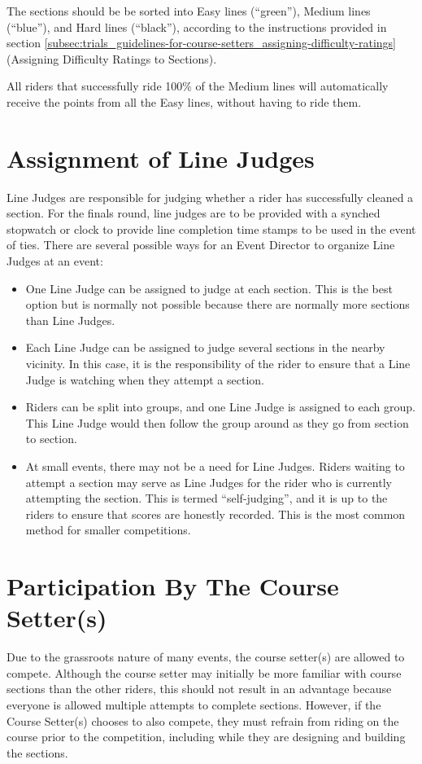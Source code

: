 The sections should be be sorted into Easy lines (``green''), Medium lines (``blue''), and Hard lines (``black''), according to the instructions provided in section \ref{subsec:trials_guidelines-for-course-setters_assigning-difficulty-ratings} (Assigning Difficulty Ratings to Sections).

All riders that successfully ride 100\% of the Medium lines will automatically receive the points from all the Easy lines, without having to ride them.

\section{Assignment of Line Judges}
Line Judges are responsible for judging whether a rider has successfully cleaned a section.
For the finals round, line judges are to be provided with a synched stopwatch or clock to provide line completion time stamps to be used in the event of ties.
There are several possible ways for an Event Director to organize Line Judges at an event:
\begin{itemize}
\item One Line Judge can be assigned to judge at each section.
This is the best option but is normally not possible because there are normally more sections than Line Judges.
\item Each Line Judge can be assigned to judge several sections in the nearby vicinity.
In this case, it is the responsibility of the rider to ensure that a Line Judge is watching when they attempt a section.
\item Riders can be split into groups, and one Line Judge is assigned to each group.
This Line Judge would then follow the group around as they go from section to section.
\item At small events, there may not be a need for Line Judges.
Riders waiting to attempt a section may serve as Line Judges for the rider who is currently attempting the section.
This is termed ``self-judging'', and it is up to the riders to ensure that scores are honestly recorded.
This is the most common method for smaller competitions.
\end{itemize}

\section{Participation By The Course Setter(s)}

Due to the grassroots nature of many events, the course setter(s) are allowed to compete.
Although the course setter may initially be more familiar with course sections than the other riders, this should not result in an advantage because everyone is allowed multiple attempts to complete sections.
However, if the Course Setter(s) chooses to also compete, they must refrain from riding on the course prior to the competition, including while they are designing and building the sections.

